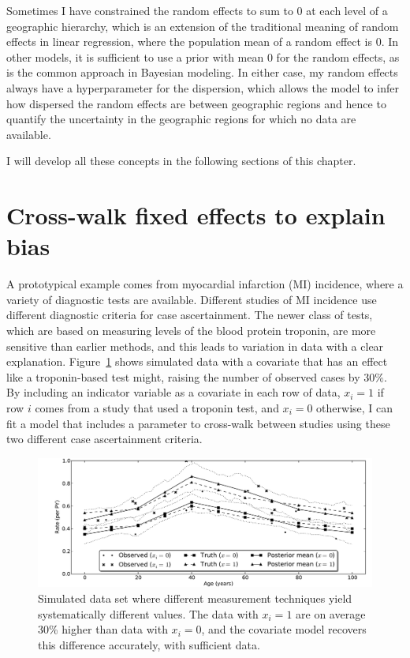 Sometimes I have constrained the random effects to sum to $0$ at each
level of a geographic hierarchy, which is an extension of the
traditional meaning of random effects in linear regression, where the
population mean of a random effect is $0$.  In other models, it is
sufficient to use a prior with mean $0$ for the random effects, as is
the common approach in Bayesian modeling.  In either case, my random
effects always have a hyperparameter for the dispersion, which allows
the model to infer how dispersed the random effects are between
geographic regions and hence to quantify the uncertainty in the
geographic regions for which no data are available.

I will develop all these concepts in the following
sections of this chapter.

\section{Cross-walk fixed effects to explain bias}

A prototypical example comes from myocardial infarction (MI)
incidence, where a variety of diagnostic tests are available.
Different studies of MI incidence use different diagnostic criteria
for case ascertainment.  The newer class of tests, which are based on
measuring levels of the blood protein troponin, are more sensitive
than earlier methods, and this leads to variation in data with a clear
explanation.  Figure~\ref{cov-sim} shows simulated data with a
covariate that has an effect like a troponin-based test might, raising
the number of observed cases by $30\%$. By including an indicator
variable as a covariate in each row of data, $x_i = 1$ if row $i$
comes from a study that used a troponin test, and $x_i = 0$ otherwise,
I can fit a model that includes a parameter to cross-walk between
studies using these two different case ascertainment criteria.

\begin{figure}[h]
\begin{center}
\includegraphics[width=\textwidth]{cov_fe.pdf}
\caption[Simulated data set where different measurement techniques
  yield systematically different values.]{Simulated data set where 
  different measurement techniques
  yield systematically different values. The data with $x_i=1$ are on
  average 30\% higher than data with $x_i=0$, and the covariate model
  recovers this difference accurately, with sufficient data.}
\label{cov-sim}
\end{center}
\end{figure}

